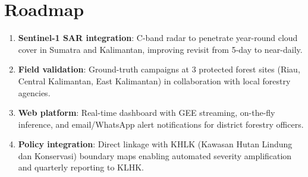 \documentclass[10pt,a4paper,onecolumn]{article}
\begin{document}
\section{Roadmap}
\begin{enumerate}[nosep,itemsep=1pt]
    \item \textbf{Sentinel-1 SAR integration}: C-band radar to
          penetrate year-round cloud cover in Sumatra and
          Kalimantan, improving revisit from 5-day to near-daily.
    \item \textbf{Field validation}: Ground-truth campaigns at 3
          protected forest sites (Riau, Central Kalimantan, East
          Kalimantan) in collaboration with local forestry agencies.
    \item \textbf{Web platform}: Real-time dashboard with GEE
          streaming, on-the-fly inference, and email/WhatsApp alert
          notifications for district forestry officers.
    \item \textbf{Policy integration}: Direct linkage with KHLK
          (Kawasan Hutan Lindung dan Konservasi) boundary maps
          enabling automated severity amplification and quarterly
          reporting to KLHK.
\end{enumerate}

\small


\end{document}
